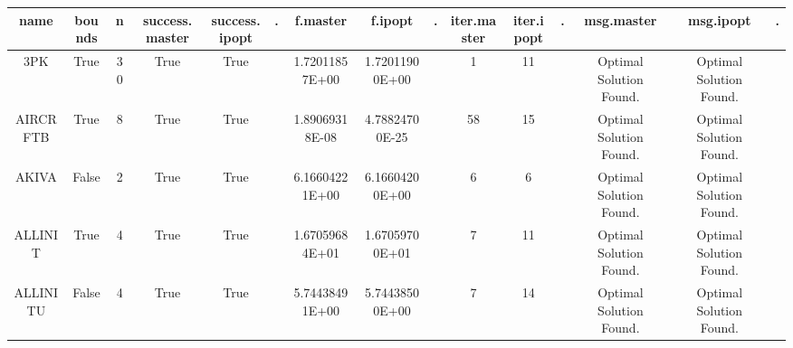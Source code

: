 \begin{longtable}{ccccccccccccccc}\cellcolor{header} name& \cellcolor{header} bounds& \cellcolor{header} n& \cellcolor{header} success.master& \cellcolor{header} success.ipopt& \cellcolor{header} .& \cellcolor{header} f.master& \cellcolor{header} f.ipopt& \cellcolor{header} .& \cellcolor{header} iter.master& \cellcolor{header} iter.ipopt& \cellcolor{header} .& \cellcolor{header} msg.master& \cellcolor{header} msg.ipopt& \cellcolor{header} .\\
	\endhead\cellcolor{default1} 3PK& \cellcolor{default1} True& \cellcolor{default1} 30& \cellcolor{default1} True& \cellcolor{default1} True& \cellcolor{header} & \cellcolor{best} 1.72011857E+00& \cellcolor{ok} 1.72011900E+00& \cellcolor{header} & \cellcolor{best} 1& \cellcolor{poor} 11& \cellcolor{header} & \cellcolor{default1} Optimal Solution Found.& \cellcolor{default1} Optimal Solution Found.& \cellcolor{header} \\
	\cellcolor{default2} AIRCRFTB& \cellcolor{default2} True& \cellcolor{default2} 8& \cellcolor{default2} True& \cellcolor{default2} True& \cellcolor{header} & \cellcolor{ok} 1.89069318E-08& \cellcolor{best} 4.78824700E-25& \cellcolor{header} & \cellcolor{poor} 58& \cellcolor{best} 15& \cellcolor{header} & \cellcolor{default2} Optimal Solution Found.& \cellcolor{default2} Optimal Solution Found.& \cellcolor{header} \\
	\cellcolor{default1} AKIVA& \cellcolor{default1} False& \cellcolor{default1} 2& \cellcolor{default1} True& \cellcolor{default1} True& \cellcolor{header} & \cellcolor{ok} 6.16604221E+00& \cellcolor{best} 6.16604200E+00& \cellcolor{header} & \cellcolor{best} 6& \cellcolor{best} 6& \cellcolor{header} & \cellcolor{default1} Optimal Solution Found.& \cellcolor{default1} Optimal Solution Found.& \cellcolor{header} \\
	\cellcolor{default2} ALLINIT& \cellcolor{default2} True& \cellcolor{default2} 4& \cellcolor{default2} True& \cellcolor{default2} True& \cellcolor{header} & \cellcolor{best} 1.67059684E+01& \cellcolor{ok} 1.67059700E+01& \cellcolor{header} & \cellcolor{best} 7& \cellcolor{ok} 11& \cellcolor{header} & \cellcolor{default2} Optimal Solution Found.& \cellcolor{default2} Optimal Solution Found.& \cellcolor{header} \\
	\cellcolor{default1} ALLINITU& \cellcolor{default1} False& \cellcolor{default1} 4& \cellcolor{default1} True& \cellcolor{default1} True& \cellcolor{header} & \cellcolor{best} 5.74438491E+00& \cellcolor{ok} 5.74438500E+00& \cellcolor{header} & \cellcolor{best} 7& \cellcolor{ok} 14& \cellcolor{header} & \cellcolor{default1} Optimal Solution Found.& \cellcolor{default1} Optimal Solution Found.& \cellcolor{header} \\

\end{longtable}
